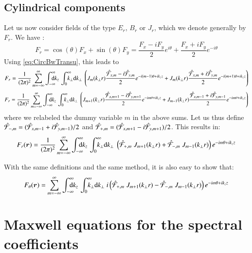 \subsection{Cylindrical components}

Let us now consider fields of the type $E_r$, $B_r$ or $J_r$, which we
denote generally by $F_r$. We have :
\begin{equation} F_r = \cos(\theta) F_x + \sin(\theta) F_y 
= \frac{F_x - iF_y}{2}e^{i\theta} + \frac{F_x +
  iF_y}{2}e^{-i\theta} \end{equation} 
Using \cref{eq:CircBwTransu}, this leads to
\begin{align} 
F_r =   \frac{1}{(2\pi)^2}\sum_{m=-\infty}^{\infty} \Integ{k_z}\,\RInteg{k_\perp }\;
\left(  J_m(k_\perp r) \frac{\spectral{F}_{x,m} -
    i\spectral{F}_{y,m}}{2}e^{-i(m-1)\theta +ik_z z} + J_m(k_\perp r) \frac{\spectral{F}_{x,m} +   i\spectral{F}_{y,m}}{2}e^{-i(m+1)\theta +
    ik_z z} \right) 
\end{align}
\begin{align}
F_r =  \frac{1}{(2\pi)^2}\sum_{m=-\infty}^{\infty} \Integ{k_z}\,\RInteg{k_\perp }\;
\left(  J_{m+1}(k_\perp r) \frac{\spectral{F}_{x,m+1} -
    i\spectral{F}_{y,m+1}}{2}e^{-im\theta +ik_z z} + J_{m-1}(k_\perp r) \frac{\spectral{F}_{x,m-1} +   i\spectral{F}_{y,m-1}}{2}e^{-im\theta +
    ik_z z} \right) 
\end{align}
where we relabeled the dummy variable $m$ in the above sums. Let us
thus define $\hat{\mathcal{F}}_{-,m} = (\hat{\mathcal{F}}_{x,m-1} +
    i\hat{\mathcal{F}}_{y,m-1})/2$ and $\hat{\mathcal{F}}_{+,m} = (\hat{\mathcal{F}}_{x,m+1} -
    i\hat{\mathcal{F}}_{y,m+1})/2$. This results in:
\begin{equation} 
F_r(\vec{r}) =  \frac{1}{(2\pi)^2}\sum_{m=-\infty}^{\infty} \Integ{k_z}\,\RInteg{k_\perp }\;
\left( \spectral{F}_{+,m}\; J_{m+1}(k_\perp r) +\spectral{F}_{-,m}\; J_{m-1}(k_\perp r)
\right)  e^{-im\theta +ik_z z}
\end{equation}

With the same definitions and the same method, it is also easy to show that:
\begin{equation} 
F_\theta(\vec{r}) = \sum_{m=-\infty}^{\infty} \Integ{k_z}\,\RInteg{k_\perp }\;
i\left( \spectral{F}_{+,m}\; J_{m+1}(k_\perp r) - \spectral{F}_{-,m}\; J_{m-1}(k_\perp r)
\right)  e^{-im\theta +ik_z z}
\end{equation}

\section{Maxwell equations for the spectral coefficients}
\label{sec:SpectMaxwell}

